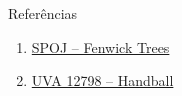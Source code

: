 \begin{frame}[fragile]{Referências}

    \begin{enumerate}
        \item \href{https://www.spoj.com/problems/FENTREE/}{SPOJ -- Fenwick Trees}

        \item \href{https://uva.onlinejudge.org/index.php?option=onlinejudge&page=show_problem&problem=4663}{UVA 12798 -- Handball}

    \end{enumerate}

\end{frame}
